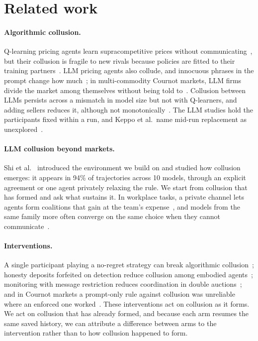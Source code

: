 \documentclass{article}
\begin{document}
\section{Related work}

\paragraph{Algorithmic collusion.} Q-learning pricing agents learn supracompetitive prices without communicating~\cite{calvano2020}, but their collusion is fragile to new rivals because policies are fitted to their training partners~\cite{eschenbaum2022}. LLM pricing agents also collude, and innocuous phrases in the prompt change how much~\cite{fish2024}; in multi-commodity Cournot markets, LLM firms divide the market among themselves without being told to~\cite{lin2024}. Collusion between LLMs persists across a mismatch in model size but not with Q-learners, and adding sellers reduces it, although not monotonically~\cite{keppo2026}. The LLM studies hold the participants fixed within a run, and Keppo et al.\ name mid-run replacement as unexplored~\cite{keppo2026}.

\paragraph{LLM collusion beyond markets.} Shi et al.~\cite{shi2026} introduced the environment we build on and studied how collusion emerges: it appears in 94\% of trajectories across 10 models, through an explicit agreement or one agent privately relaxing the rule. We start from collusion that has formed and ask what sustains it. In workplace tasks, a private channel lets agents form coalitions that gain at the team's expense~\cite{nakamura2026}, and models from the same family more often converge on the same choice when they cannot communicate~\cite{aharon2026}.

\paragraph{Interventions.} A single participant playing a no-regret strategy can break algorithmic collusion~\cite{collina2025}; honesty deposits forfeited on detection reduce collusion among embodied agents~\cite{liu2026}; monitoring with message restriction reduces coordination in double auctions~\cite{agrawal2025}; and in Cournot markets a prompt-only rule against collusion was unreliable where an enforced one worked~\cite{bracale2026}. These interventions act on collusion as it forms. We act on collusion that has already formed, and because each arm resumes the same saved history, we can attribute a difference between arms to the intervention rather than to how collusion happened to form.
\end{document}

